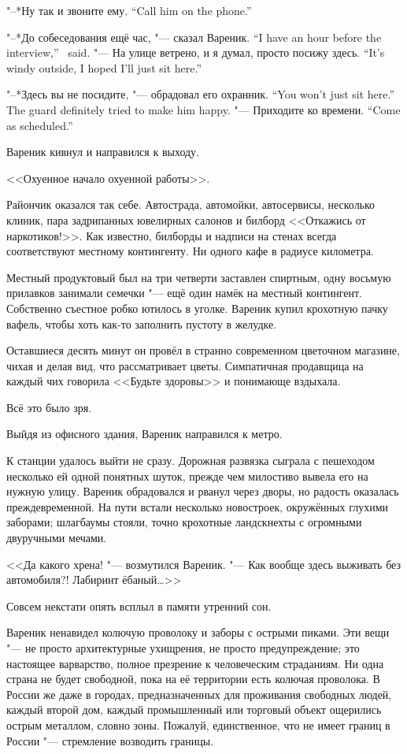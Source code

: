 {"--*Ну так и звоните ему.}
{``Call him on the phone.''}

{"--*До собеседования ещё час, "--- сказал Вареник.}
{``I have an hour before the interview,'' \Varenik\ said.}
{"--- На улице ветрено, и я думал, просто посижу здесь.}
{``It's windy outside, I hoped I'll just sit here.''}

{"--*Здесь вы не посидите, "--- обрадовал его охранник.}
{``You won't just sit here.'' The guard definitely tried to make him happy.}
{"--- Приходите ко времени.}
{``Come as scheduled.''}

Вареник кивнул и направился к выходу.

<<Охуенное начало охуенной работы>>.

Райончик оказался так себе.
Автострада, автомойки, автосервисы, несколько клиник, пара задрипанных ювелирных салонов и билборд <<Откажись от наркотиков!>>.
Как известно, билборды и надписи на стенах всегда соответствуют местному контингенту.
Ни одного кафе в радиусе километра.

Местный продуктовый был на три четверти заставлен спиртным, одну восьмую прилавков занимали семечки "--- ещё один намёк на местный контингент.
Собственно съестное робко ютилось в уголке.
Вареник купил крохотную пачку вафель, чтобы хоть как-то заполнить пустоту в желудке.

Оставшиеся десять минут он провёл в странно современном цветочном магазине, чихая и делая вид, что рассматривает цветы.
Симпатичная продавщица на каждый чих говорила <<Будьте здоровы>> и понимающе вздыхала.

Всё это было зря.

\asterism

Выйдя из офисного здания, Вареник направился к метро.

К станции удалось выйти не сразу.
Дорожная развязка сыграла с пешеходом несколько ей одной понятных шуток, прежде чем милостиво вывела его на нужную улицу.
Вареник обрадовался и рванул через дворы, но радость оказалась преждевременной.
На пути встали несколько новостроек, окружённых глухими заборами;
шлагбаумы стояли, точно крохотные ландскнехты с огромными двуручными мечами.

<<Да какого хрена! "--- возмутился Вареник.
"--- Как вообще здесь выживать без автомобиля?!
Лабиринт ёбаный\dots{}>>

Совсем некстати опять всплыл в памяти утренний сон.

Вареник ненавидел колючую проволоку и заборы с острыми пиками.
Эти вещи "--- не просто архитектурные ухищрения, не просто предупреждение;
это настоящее варварство, полное презрение к человеческим страданиям.
Ни одна страна не будет свободной, пока на её территории есть колючая проволока.
В России же даже в городах, предназначенных для проживания свободных людей, каждый второй дом, каждый промышленный или торговый объект ощерились острым металлом, словно зоны.
Пожалуй, единственное, что не имеет границ в России "--- стремление возводить границы.

